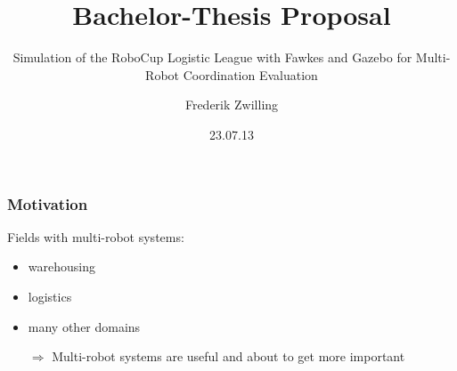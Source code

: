 \documentclass{beamer}
\title{Bachelor-Thesis Proposal}
\subtitle{Simulation of the RoboCup Logistic League with Fawkes and Gazebo for Multi-Robot Coordination Evaluation}
\author {Frederik Zwilling}
\institute{RWTH Aachen}
\date{23.07.13}
\begin{document}
\frame{\titlepage}


\begin{frame}
\frametitle{Motivation}
\begin{multicols}{2}
\begin{figure}
\end{figure}
Fields with multi-robot systems:
\begin{itemize}
\item<1-> warehousing
\item<2-> logistics
\item<3-> many other domains
\end{itemize}
\end{multicols}
\pause \pause \pause 
\begin{itemize}
\item[$\Rightarrow$] Multi-robot systems are useful and about to get more important
\end{itemize}
\end{frame}
\end{document}
